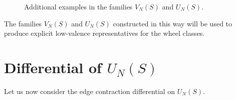 \documentclass[11pt]{article}
\theoremstyle{definition}
\theoremstyle{plain}
\newcommand{\LeftChoice}{\mathrm{left}}
\newcommand{\RightChoice}{\mathrm{right}}
\begin{document}
\begin{figure}[H]
\centering
\captionsetup{font=scriptsize}
\vspace{-0.8em}
\begin{minipage}{0.32\linewidth}
\centering
\resizebox{0.60\linewidth}{!}{}
\caption*{$V_9(\LeftChoice,\RightChoice,\LeftChoice)$}
\end{minipage}\hfill
\begin{minipage}{0.32\linewidth}
\centering
\resizebox{0.60\linewidth}{!}{}
\caption*{$V_9(\LeftChoice,\LeftChoice,\RightChoice)$}
\end{minipage}\hfill
\begin{minipage}{0.32\linewidth}
\centering
\resizebox{0.60\linewidth}{!}{}
\caption*{$V_9(\LeftChoice,\LeftChoice,\LeftChoice)$}
\end{minipage}
\vspace{-0.35em}

\par\noindent
\begin{minipage}{0.32\linewidth}
\centering
\resizebox{0.60\linewidth}{!}{}
\caption*{$V_{13}(\LeftChoice,\RightChoice)$}
\end{minipage}\hfill
\begin{minipage}{0.32\linewidth}
\centering
\resizebox{0.60\linewidth}{!}{}
\caption*{$U_{13}(\LeftChoice,\RightChoice)$}
\end{minipage}\hfill
\begin{minipage}{0.32\linewidth}
\centering
\resizebox{0.60\linewidth}{!}{}
\caption*{$V_{13}(\LeftChoice,\RightChoice,\LeftChoice)$}
\end{minipage}
\caption{Additional examples in the families $V_N(S)$ and $U_N(S)$.}
\label{fig:VN-UN-examples}
\end{figure}

The families $V_N(S)$ and $U_N(S)$ constructed in this way will be used to produce explicit low-valence representatives for the wheel classes.

\section[Differential of the family U\_N(S)]{Differential of \texorpdfstring{$U_N(S)$}{U_N(S)}}

Let us now consider the edge contraction differential on $U_N(S)$. 
\end{document}
